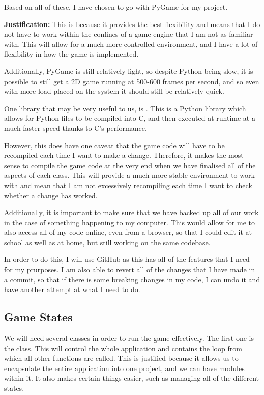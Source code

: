 Based on all of these, I have chosen to go with PyGame for my project. 
\vs

\textbf{Justification:} This is because it provides the best flexibility and means that I do not have to work within the confines of a game engine that I am not as familiar with. This will allow for a much more controlled environment, and I have a lot of flexibility in how the game is implemented.

\vs
Additionally, PyGame is still relatively light, so despite Python being slow, it is possible to still get a 2D game running at 500-600 frames per second, and so even with more load placed on the system it should still be relatively quick.

\vs
One library that may be very useful to us, is . This is a Python library which allows for Python files to be compiled into C, and then executed at runtime at a much faster speed thanks to C's performance.

\vs
However, this does have one caveat that the game code will have to be recompiled each time I want to make a change. Therefore, it makes the most sense to compile the game code at the very end when we have finalised all of the aspects of each class. This will provide a much more stable environment to work with and mean that I am not excessively recompiling each time I want to check whether a change has worked.
\vs

Additionally, it is important to make sure that we have backed up all of our work in the case of something happening to my computer. This would allow for me to also access all of my code online, even from a browser, so that I could edit it at school as well as at home, but still working on the same codebase.

\vs
In order to do this, I will use GitHub as this has all of the features that I need for my prurposes. I am also able to revert all of the changes that I have made in a commit, so that if there is some breaking changes in my code, I can undo it and have another attempt at what I need to do.

\subsection{Game States}

We will need several classes in order to run the game effectively. The first one is the  class. This will control the whole application and contains the loop from which all other functions are called. This is justified because it allows us to encapsulate the entire application into one project, and we can have modules within it. It also makes certain things easier, such as managing all of the different states.

